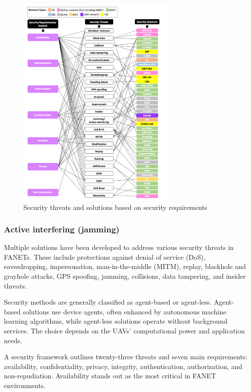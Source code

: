     \begin{figure}[ht]
        \centering
        \includegraphics[width=0.7\textwidth]{Figures/Chapter2/Section2/7.png}
        \caption{ Security threats and solutions based on security requirements ~\cite{tsao2022survey}}
        \label{fig:threats_solutions}
    \end{figure}

\subsubsection{Active interfering (jamming)}

Multiple solutions have been developed to address various security threats in FANETs. These include protections against denial of service (DoS), eavesdropping, impersonation, man-in-the-middle (MITM), replay, blackhole and grayhole attacks, GPS spoofing, jamming, collisions, data tampering, and insider threats.

Security methods are generally classified as agent-based or agent-less. Agent-based solutions use device agents, often enhanced by autonomous machine learning algorithms, while agent-less solutions operate without background services. The choice depends on the UAVs’ computational power and application needs.

A security framework outlines twenty-three threats and seven main requirements: availability, confidentiality, privacy, integrity, authentication, authorization, and non-repudiation. Availability stands out as the most critical in FANET environments.

